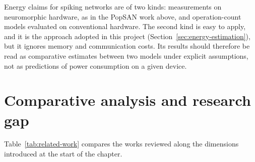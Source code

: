 Energy claims for spiking networks are of two kinds: measurements on neuromorphic hardware, as in the PopSAN work above, and operation-count models evaluated on conventional hardware.
The second kind is easy to apply, and it is the approach adopted in this project (Section~\ref{sec:energy-estimation}), but it ignores memory and communication costs.
Its results should therefore be read as comparative estimates between two models under explicit assumptions, not as predictions of power consumption on a given device.

\section{Comparative analysis and research gap}
\label{sec:sota-gap}

Table~\ref{tab:related-work} compares the works reviewed along the dimensions introduced at the start of the chapter.

